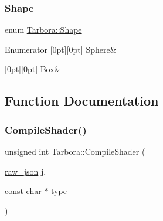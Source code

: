 \subsubsection{\texorpdfstring{Shape}{Shape}}
{\footnotesize\ttfamily enum \hyperlink{namespaceTarbora_ae465acce25913e46aa412ce0fb100d6d}{Tarbora\+::\+Shape}}

\begin{DoxyEnumFields}{Enumerator}
[0pt][0pt]{}\mbox{\label{namespaceTarbora_ae465acce25913e46aa412ce0fb100d6dacf01437461ee1c3bed5f0aff629a2027}} 
Sphere&\\
\hline

[0pt][0pt]{}\mbox{\label{namespaceTarbora_ae465acce25913e46aa412ce0fb100d6da139e58b5829f7f9624c775057b55dc4b}} 
Box&\\
\hline

\end{DoxyEnumFields}


\subsection{Function Documentation}
\mbox{\label{namespaceTarbora_a4670fe58329d440f3622b980acab59ed}} 
\subsubsection{\texorpdfstring{Compile\+Shader()}{CompileShader()}}
{\footnotesize\ttfamily unsigned int Tarbora\+::\+Compile\+Shader (\begin{DoxyParamCaption}\item[{\hyperlink{Shader_8cpp_a6c714f7f62aad8e7c7adf29f3247c2ac}{raw\+\_\+json}}]{j,  }\item[{const char $\ast$}]{type }\end{DoxyParamCaption})}

